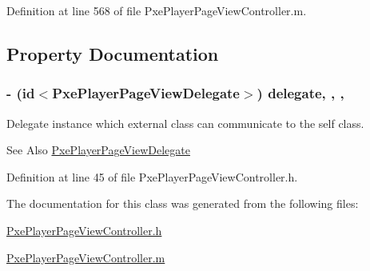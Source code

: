 Definition at line 568 of file Pxe\-Player\-Page\-View\-Controller.\-m.



\subsection{Property Documentation}
\hypertarget{interface_pxe_player_page_view_controller_a2aa145c2a06f8708869f4a3d7e7aad1d}{
\subsubsection[{delegate}]{\setlength{\rightskip}{0pt plus 5cm}-\/ (id$<${\bf Pxe\-Player\-Page\-View\-Delegate}$>$) delegate\hspace{0.3cm}{\ttfamily [read]}, {\ttfamily [write]}, {\ttfamily [nonatomic]}, {\ttfamily [weak]}}}\label{interface_pxe_player_page_view_controller_a2aa145c2a06f8708869f4a3d7e7aad1d}
Delegate instance which external class can communicate to the self class. \begin{DoxySeeAlso}{See Also}
\hyperlink{protocol_pxe_player_page_view_delegate-p}{Pxe\-Player\-Page\-View\-Delegate} 
\end{DoxySeeAlso}


Definition at line 45 of file Pxe\-Player\-Page\-View\-Controller.\-h.



The documentation for this class was generated from the following files\-:\begin{DoxyCompactItemize}
\item 
\hyperlink{_pxe_player_page_view_controller_8h}{Pxe\-Player\-Page\-View\-Controller.\-h}\item 
\hyperlink{_pxe_player_page_view_controller_8m}{Pxe\-Player\-Page\-View\-Controller.\-m}\end{DoxyCompactItemize}

